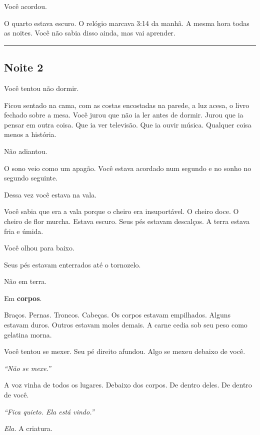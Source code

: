 \noindent Você acordou.

\noindent O quarto estava escuro. O relógio marcava 3:14 da manhã. A mesma hora todas as noites. Você não sabia disso ainda, mas vai aprender.

\vspace{0.5em}\noindent\rule{\textwidth}{0.5pt}\vspace{0.5em}

\subsection*{Noite 2}

\noindent Você tentou não dormir.

\noindent Ficou sentado na cama, com as costas encostadas na parede, a luz acesa, o livro fechado sobre a mesa. Você jurou que não ia ler antes de dormir. Jurou que ia pensar em outra coisa. Que ia ver televisão. Que ia ouvir música. Qualquer coisa menos a história.

\noindent Não adiantou.

\noindent O sono veio como um apagão. Você estava acordado num segundo e no sonho no segundo seguinte.

\noindent Dessa vez você estava na vala.

\noindent Você sabia que era a vala porque o cheiro era insuportável. O cheiro doce. O cheiro de flor murcha. Estava escuro. Seus pés estavam descalços. A terra estava fria e úmida.

\noindent Você olhou para baixo.

\noindent Seus pés estavam enterrados até o tornozelo.

\noindent Não em terra.

\noindent Em \textbf{corpos}.

\noindent Braços. Pernas. Troncos. Cabeças. Os corpos estavam empilhados. Alguns estavam duros. Outros estavam moles demais. A carne cedia sob seu peso como gelatina morna.

\noindent Você tentou se mexer. Seu pé direito afundou. Algo se mexeu debaixo de você.

\noindent \textit{\textquotedblleft{}Não se mexe.\textquotedblright{}}

\noindent A voz vinha de todos os lugares. Debaixo dos corpos. De dentro deles. De dentro de você.

\noindent \textit{\textquotedblleft{}Fica quieto. Ela está vindo.\textquotedblright{}}

\noindent \textit{Ela.} A criatura.

